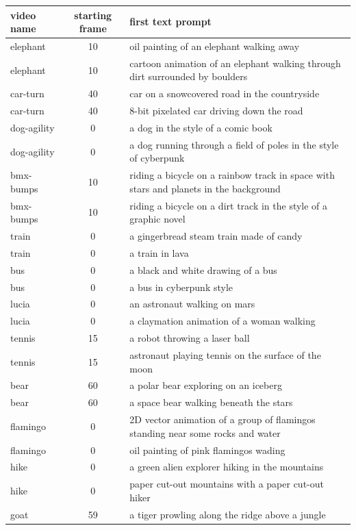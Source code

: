 \begin{table}[tp]
\centering
\begin{tabular}{lcp{10cm}}
\toprule
video name & starting frame & first text prompt \\
\midrule
elephant & 10 & oil painting of an elephant walking away \\
elephant & 10 & cartoon animation of an elephant walking through dirt surrounded by boulders \\
car-turn & 40 & car on a snowcovered road in the countryside \\
car-turn & 40 & 8-bit pixelated car driving down the road \\
dog-agility & 0 & a dog in the style of a comic book \\
dog-agility & 0 & a dog running through a field of poles in the style of cyberpunk \\
bmx-bumps & 10 & riding a bicycle on a rainbow track in space with stars and planets in the background \\
bmx-bumps & 10 & riding a bicycle on a dirt track in the style of a graphic novel \\
train & 0 & a gingerbread steam train made of candy \\
train & 0 & a train in lava \\
bus & 0 & a black and white drawing of a bus \\
bus & 0 & a bus in cyberpunk style \\
lucia & 0 & an astronaut walking on mars \\
lucia & 0 & a claymation animation of a woman walking  \\
tennis & 15 & a robot throwing a laser ball \\
tennis & 15 & astronaut playing tennis on the surface of the moon \\
bear & 60 & a polar bear exploring on an iceberg \\
bear & 60 & a space bear walking beneath the stars  \\
flamingo & 0 & 2D vector animation of a group of flamingos standing near some rocks and water \\
flamingo & 0 & oil painting of pink flamingos wading \\
hike & 0 & a green alien explorer hiking in the mountains \\
hike & 0 & paper cut-out mountains with a paper cut-out hiker \\
goat & 59 & a tiger prowling along the ridge above a jungle \\

\end{tabular}
\end{table}
